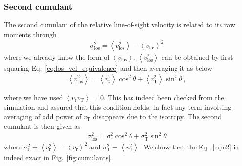 \documentclass[a4paper,fleqn,usenatbib]{mnras}
\begin{document}
	\subsubsection{Second cumulant}
	The second cumulant of the relative line-of-sight velocity is related to its raw moments through
	\begin{eqnarray}
		\sigma^2_{\mathrm{los}} =  \left\langle v^2_{\mathrm{los}} \right\rangle - \left\langle v_{\mathrm{los}} \right\rangle^2 
	\end{eqnarray}
	\noindent where we already know the form of $\left\langle v_{\mathrm{los}} \right\rangle$. $\left\langle v^2_{\mathrm{los}} \right\rangle$ can be obtained by first squaring Eq.~\ref{eq:los_vel_equivalence} and then averaging it as below
	\begin{eqnarray}\label{eq:v2}
		\left\langle v^2_{\mathrm{los}} \right\rangle = \left\langle v^2_{\mathrm{r}}\right\rangle \cos^2\theta + \left\langle v^2_{\mathrm{T}}\right\rangle\sin^2\theta \, ,
	\end{eqnarray}
	
	\noindent where we have used $\left\langle v_{\mathrm{r}} v_{\mathrm{T}}\right\rangle$ = 0. This has indeed been checked from the simulation and assured that this condition holds. In fact any term involving averaging of odd power of $v_{\mathrm{T}}$ disappears due to the isotropy.  The second cumulant is then given as 
	\begin{eqnarray}\label{eq:c2}
		\sigma^2_{\mathrm{los}} =  \sigma^2_{\mathrm{r}} \cos^2\theta + \sigma^2_{\mathrm{T}} \sin^2\theta
	\end{eqnarray}
	\noindent where $\sigma^2_{\mathrm{r}} = \left\langle v^2_{\mathrm{r}} \right\rangle - \left\langle v_{\mathrm{r}}\right\rangle^2$ and $\sigma^2_{\mathrm{T}} = \left\langle v^2_{\mathrm{T}} \right\rangle$. We show that the Eq.~\ref{eq:c2} is indeed exact in Fig.~\ref{fig:cumulants}.
\end{document}
